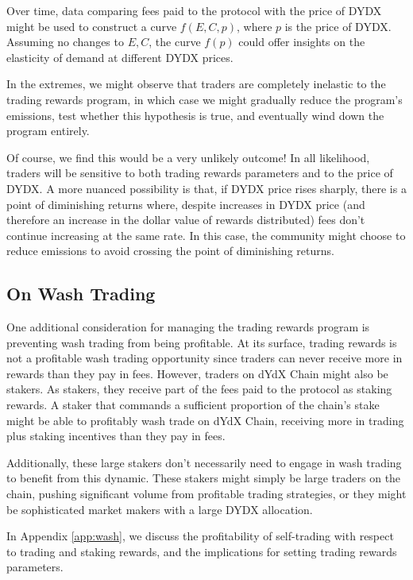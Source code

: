             Over time, data comparing fees paid to the protocol with the price of DYDX might be used to construct a curve $f(E, C, p)$, where $p$ is the price of DYDX. Assuming no changes to $E, C$, the curve $f(p)$ could offer insights on the elasticity of demand at different DYDX prices. 

            In the extremes, we might observe that traders are completely inelastic to the trading rewards program, in which case we might gradually reduce the program's emissions, test whether this hypothesis is true, and eventually wind down the program entirely.

            Of course, we find this would be a very unlikely outcome! In all likelihood, traders will be sensitive to both trading rewards parameters and to the price of DYDX. A more nuanced possibility is that, if DYDX price rises sharply, there is a point of diminishing returns where, despite increases in DYDX price (and therefore an increase in the dollar value of rewards distributed) fees don't continue increasing at the same rate. In this case, the community might choose to reduce emissions to avoid crossing the point of diminishing returns. 

    \subsection{On Wash Trading}

        One additional consideration for managing the trading rewards program is preventing wash trading from being profitable. At its surface, trading rewards is not a profitable wash trading opportunity since traders can never receive more in rewards than they pay in fees. However, traders on dYdX Chain might also be stakers. As stakers, they receive part of the fees paid to the protocol as staking rewards. A staker that commands a sufficient proportion of the chain's stake might be able to profitably wash trade on dYdX Chain, receiving more in trading plus staking incentives than they pay in fees.

        Additionally, these large stakers don't necessarily need to engage in wash trading to benefit from this dynamic. These stakers might simply be large traders on the chain, pushing significant volume from profitable trading strategies, or they might be sophisticated market makers with a large DYDX allocation. 

        In Appendix \ref{app:wash}, we discuss the profitability of self-trading with respect to trading and staking rewards, and the implications for setting trading rewards parameters.


